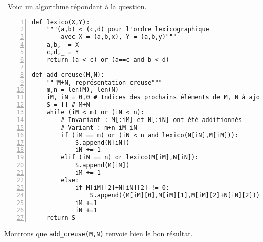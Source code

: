 \question\
Voici un algorithme répondant à la question. 
\begin{Verbatim}[gobble=0,numbers=left]
def lexico(X,Y):
    """(a,b) < (c,d) pour l'ordre lexicographique
        avec X = (a,b,x), Y = (a,b,y)"""
    a,b,_ = X
    c,d,_ = Y
    return (a < c) or (a==c and b < d) 

def add_creuse(M,N):
    """M+N, représentation creuse"""
    m,n = len(M), len(N)
    iM, iN = 0,0 # Indices des prochains éléments de M, N à ajouter
    S = [] # M+N
    while (iM < m) or (iN < n):
        # Invariant : M[:iM] et N[:iN] ont été additionnés
        # Variant : m+n-iM-iN
        if (iM == m) or (iN < n and lexico(N[iN],M[iM])):
            S.append(N[iN])
            iN += 1
        elif (iN == n) or lexico(M[iM],N[iN]):
            S.append(M[iM])
            iM += 1
        else:
            if M[iM][2]+N[iN][2] != 0:
                S.append((M[iM][0],M[iM][1],M[iM][2]+N[iN][2]))
            iM +=1
            iN +=1
    return S
\end{Verbatim}
Montrons que \texttt{add\_creuse(M,N)} renvoie bien le bon résultat. 
